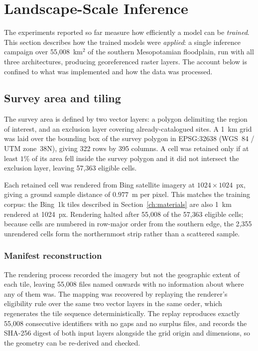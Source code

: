 \section{Landscape-Scale Inference}
\label{ch:discovery}

The experiments reported so far measure how efficiently a model can be
\emph{trained}. This section describes how the trained models were
\emph{applied}: a single inference campaign over 55{,}008~km$^2$ of the southern
Mesopotamian floodplain, run with all three architectures, producing
georeferenced raster layers. The account below is confined to what was
implemented and how the data was processed.

\subsection{Survey area and tiling}
\label{sec:disc-area}

The survey area is defined by two vector layers: a polygon delimiting the
region of interest, and an exclusion layer covering already-catalogued sites. A
1~km grid was laid over the bounding box of the survey polygon in EPSG:32638
(WGS~84 / UTM zone~38N), giving 322 rows by 395 columns. A cell was retained
only if at least $1\%$ of its area fell inside the survey polygon and it did not
intersect the exclusion layer, leaving 57{,}363 eligible cells.

Each retained cell was rendered from Bing satellite imagery at
$1024\times1024$~px, giving a ground sample distance of $0.977$~m per pixel.
This matches the training corpus: the Bing~1k tiles described in
Section~\ref{ch:materials} are also 1~km rendered at 1024~px. Rendering halted
after 55{,}008 of the 57{,}363 eligible cells; because cells are numbered in
row-major order from the southern edge, the 2{,}355 unrendered cells form the
northernmost strip rather than a scattered sample.

\subsubsection{Manifest reconstruction}
The rendering process recorded the imagery but not the geographic extent of each
tile, leaving 55{,}008 files named  onwards with no
information about where any of them was. The mapping was recovered by replaying
the renderer's eligibility rule over the same two vector layers in the same
order, which regenerates the tile sequence deterministically. The replay
reproduces exactly 55{,}008 consecutive identifiers with no gaps and no surplus
files, and records the SHA-256 digest of both input layers alongside the grid
origin and dimensions, so the geometry can be re-derived and checked.

